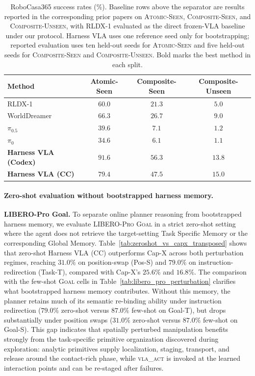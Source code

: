 \documentclass[11pt]{article}
\begin{document}
\begin{table}[htbp]
\centering
\caption{RoboCasa365 success rates (\%). Baseline rows above the separator are results reported in the corresponding prior papers on \textsc{Atomic-Seen}, \textsc{Composite-Seen}, and \textsc{Composite-Unseen}, with RLDX-1 evaluated as the direct frozen-VLA baseline under our protocol. Harness VLA uses one reference seed only for bootstrapping; reported evaluation uses ten held-out seeds for \textsc{Atomic-Seen} and five held-out seeds for \textsc{Composite-Seen} and \textsc{Composite-Unseen}. Bold marks the best method in each split.}
\label{tab:robocasa_main}
\small
\setlength{\tabcolsep}{7pt}
\begin{tabular}{l ccc}
\toprule
Method & Atomic-Seen & Composite-Seen & Composite-Unseen \\
\midrule
RLDX-1~\citep{kim2026rldx} & $60.0$ & $21.3$ & $5.0$ \\
WorldDreamer~\citep{wang2024worlddreamer} & $66.3$ & $26.7$ & $9.0$ \\
$\pi_{0.5}$~\citep{black2025pi05} & $39.6$ & $7.1$ & $1.2$ \\
$\pi_0$~\citep{black2025pi0} & $34.6$ & $6.1$ & $1.1$ \\
\midrule
\textbf{Harness VLA (Codex)} & $\mathbf{91.6}$ & $\mathbf{56.3}$ & $13.8$ \\
\textbf{Harness VLA (CC)} & $79.4$ & $47.5$ & $\mathbf{15.0}$ \\
\bottomrule
\end{tabular}
\end{table}

\paragraph{Zero-shot evaluation without bootstrapped harness memory.}
\textbf{LIBERO-Pro Goal.} To separate online planner reasoning from bootstrapped harness memory, we evaluate \textsc{LIBERO-Pro Goal} in a strict zero-shot setting where the agent does not retrieve the target-setting Task Specific Memory or the corresponding Global Memory. Table~\ref{tab:zeroshot_vs_capx_transposed} shows that zero-shot Harness VLA (CC) outperforms Cap-X across both perturbation regimes, reaching $31.0\%$ on position-swap (Pos-S) and $79.0\%$ on instruction-redirection (Task-T), compared with Cap-X's $25.6\%$ and $16.8\%$. The comparison with the few-shot \textsc{Goal} cells in Table~\ref{tab:libero_pro_perturbation} clarifies what bootstrapped harness memory contributes. Without this memory, the planner retains much of its semantic re-binding ability under instruction redirection ($79.0\%$ zero-shot versus $87.0\%$ few-shot on Goal-T), but drops substantially under position swaps ($31.0\%$ zero-shot versus $87.0\%$ few-shot on Goal-S). This gap indicates that spatially perturbed manipulation benefits strongly from the task-specific primitive organization discovered during exploration: analytic primitives supply localization, staging, transport, and release around the contact-rich phase, while \textsc{vla\_act} is invoked at the learned interaction points and can be re-staged after failures.
\end{document}
